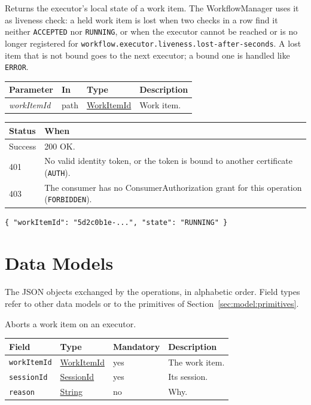 \documentclass[a4paper]{arrowhead}
\newcommand{\fparam}[1]{\textit{\textcolor{ArrowheadBlue}{#1}}}
\newcommand{\pref}[1]{{\textcolor{ArrowheadGrey}{\hyperref[sec:model:primitives:#1]{#1}}}}
\begin{document}
Returns the executor's local state of a work item. The WorkflowManager uses it as liveness check: a held work item is lost when two checks in a row find it neither \texttt{ACCEPTED} nor \texttt{RUNNING}, or when the executor cannot be reached or is no longer registered for \texttt{workflow.\allowbreak{}executor.\allowbreak{}liveness.\allowbreak{}lost-\allowbreak{}after-\allowbreak{}seconds}. A lost item that is not bound goes to the next executor; a bound one is handled like \texttt{ERROR}.

{\small
\begin{longtable}{|p{3.0cm}|p{1.4cm}|p{3.2cm}|p{8.2cm}|}

\hline
\rowcolor{gray!33} Parameter & In & Type & Description \\ \hline
\endhead
\fparam{workItemId} & path & \pref{WorkItemId} & Work item. \\ \hline
\end{longtable}
}


{\small
\begin{longtable}{|p{2.0cm}|p{13.8cm}|}

\hline
\rowcolor{gray!33} Status & When \\ \hline
\endhead
Success & 200 OK. \\ \hline
401 & No valid identity token, or the token is bound to another certificate (\texttt{AUTH}). \\ \hline
403 & The consumer has no ConsumerAuthorization grant for this operation (\texttt{FORBIDDEN}). \\ \hline
\end{longtable}
}


\begin{lstlisting}[caption={Example response body}]
{ "workItemId": "5d2c0b1e-...", "state": "RUNNING" }
\end{lstlisting}


\newpage
\section{Data Models}
\label{sec:model}
The JSON objects exchanged by the operations, in alphabetic order. Field types refer to other data models or to the
primitives of Section~\ref{sec:model:primitives}.

Aborts a work item on an executor.

{\small
\begin{longtable}{|p{3.7cm}|p{4.2cm}|p{1.6cm}|p{6.3cm}|}

\hline
\rowcolor{gray!33} Field & Type & Mandatory & Description \\ \hline
\endhead
\texttt{workItemId} & \pref{WorkItemId} & yes & The work item. \\ \hline
\texttt{sessionId} & \pref{SessionId} & yes & Its session. \\ \hline
\texttt{reason} & \pref{String} & no & Why. \\ \hline
\end{longtable}
}
\end{document}
